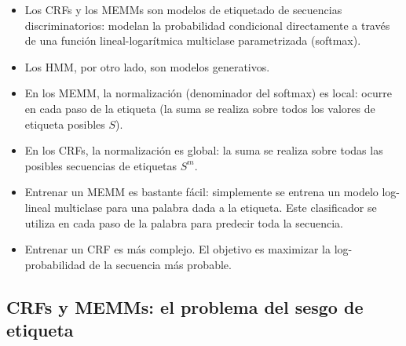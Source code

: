 \begin{itemize}

\item Los CRFs y los MEMMs son modelos de etiquetado de secuencias discriminatorios: modelan la probabilidad condicional directamente a través de una función lineal-logarítmica multiclase parametrizada (softmax).

\item Los HMM, por otro lado, son modelos generativos.

\item En los MEMM, la normalización (denominador del softmax) es local: ocurre en cada paso de la etiqueta (la suma se realiza sobre todos los valores de etiqueta posibles $S$).

\item En los CRFs, la normalización es global: la suma se realiza sobre todas las posibles secuencias de etiquetas $S^m$.

\item Entrenar un MEMM es bastante fácil: simplemente se entrena un modelo log-lineal multiclase para una palabra dada a la etiqueta. Este clasificador se utiliza en cada paso de la palabra para predecir toda la secuencia.

\item Entrenar un CRF es más complejo. El objetivo es maximizar la log-probabilidad de la secuencia más probable.

\end{itemize}



\subsection{CRFs y MEMMs: el problema del sesgo de etiqueta}

